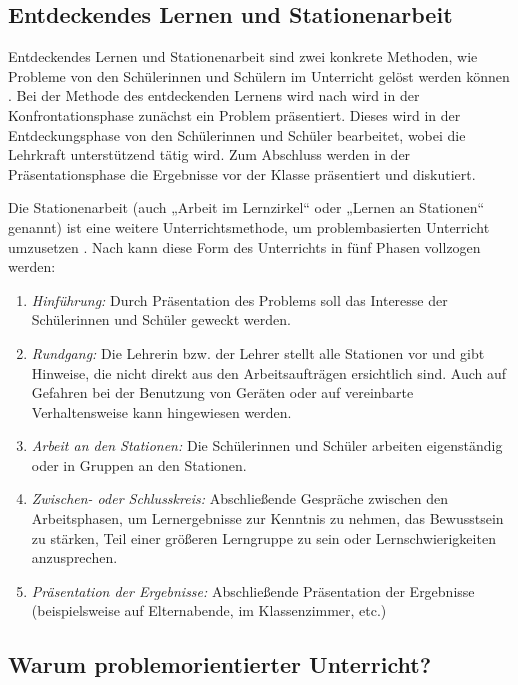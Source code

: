 \documentclass[man,12pt,a4paper]{apa6}
\begin{document}
\subsection{Entdeckendes Lernen und Stationenarbeit}

Entdeckendes Lernen und Stationenarbeit sind zwei konkrete Methoden, wie Probleme von den Schülerinnen und Schülern im Unterricht gelöst werden können \parencite{kunter2013}. Bei der Methode des entdeckenden Lernens wird nach \textcite{hameyer2008} wird in der Konfrontationsphase zunächst ein Problem präsentiert. Dieses wird in der Entdeckungsphase von den Schülerinnen und Schüler bearbeitet, wobei die Lehrkraft unterstützend tätig wird. Zum Abschluss werden in der Präsentationsphase die Ergebnisse vor der Klasse präsentiert und diskutiert.

Die Stationenarbeit (auch „Arbeit im Lernzirkel“ oder „Lernen an Stationen“ genannt) ist eine weitere Unterrichtsmethode, um problembasierten Unterricht umzusetzen \parencite{hegele2008}. Nach \textcite{hegele2008} kann diese Form des Unterrichts in fünf Phasen vollzogen werden:

\begin{enumerate}
  \item \emph{Hinführung:} Durch Präsentation des Problems soll das Interesse der Schülerinnen und Schüler geweckt werden.
  \item \emph{Rundgang:} Die Lehrerin bzw. der Lehrer stellt alle Stationen vor und gibt Hinweise, die nicht direkt aus den Arbeitsaufträgen ersichtlich sind. Auch auf Gefahren bei der Benutzung von Geräten oder auf vereinbarte Verhaltensweise kann hingewiesen werden.
  \item \emph{Arbeit an den Stationen:} Die Schülerinnen und Schüler arbeiten eigenständig oder in Gruppen an den Stationen.
  \item \emph{Zwischen- oder Schlusskreis:} Abschließende Gespräche zwischen den Arbeitsphasen, um Lernergebnisse zur Kenntnis zu nehmen, das Bewusstsein zu stärken, Teil einer größeren Lerngruppe zu sein oder Lernschwierigkeiten anzusprechen.
  \item \emph{Präsentation der Ergebnisse:} Abschließende Präsentation der Ergebnisse (beispielsweise auf Elternabende, im Klassenzimmer, etc.)
\end{enumerate}

\subsection{Warum problemorientierter Unterricht?}
\end{document}

